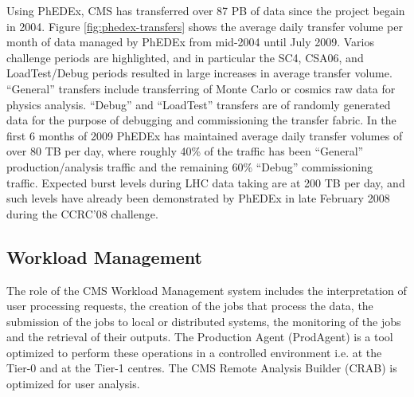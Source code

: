 Using PhEDEx, CMS has transferred over 87 PB of data since the project
begain in 2004.  Figure \ref{fig:phedex-transfers} shows the average
daily transfer volume per month of data managed by PhEDEx from
mid-2004 until July 2009.  Varios challenge periods are highlighted,
and in particular the SC4, CSA06, and LoadTest/Debug periods resulted
in large increases in average transfer volume.  ``General'' transfers
include transferring of Monte Carlo or cosmics raw data for physics
analysis.  ``Debug'' and ``LoadTest'' transfers are of randomly
generated data for the purpose of debugging and commissioning the
transfer fabric.  In the first 6 months of 2009 PhEDEx has maintained
average daily transfer volumes of over 80 TB per day, where roughly
40\% of the traffic has been ``General'' production/analysis traffic
and the remaining 60\% ``Debug'' commissioning traffic.  Expected
burst levels during LHC data taking are at 200 TB per day, and such
levels have already been demonstrated by PhEDEx in late February 2008
during the CCRC'08 challenge.

\subsection{Workload Management}
The role of the CMS Workload Management system includes the interpretation of user processing requests, the creation of the jobs that process the data, the submission of the jobs to local or distributed systems, the monitoring of the jobs and the retrieval of their outputs. The Production Agent (ProdAgent)\cite{RefPA} is a tool optimized to perform these operations in a controlled environment i.e. at the Tier-0 and at the Tier-1 centres. The CMS Remote Analysis Builder (CRAB) is optimized for user analysis.

%
\label{sec:3_2}
